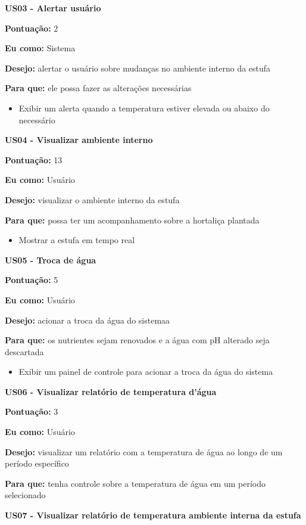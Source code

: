 \textbf{US03 - Alertar usuário}

\textbf{Pontuação:} 2

\textbf{Eu como:} Sistema

\textbf{Desejo:} alertar o usuário sobre mudanças no ambiente interno da estufa

\textbf{Para que:} ele possa fazer as alterações necessárias

\begin{itemize}
	\item Exibir um alerta quando a temperatura estiver elevada ou abaixo do necessário
\end{itemize}

\textbf{US04 - Visualizar ambiente interno}

\textbf{Pontuação:} 13

\textbf{Eu como:} Usuário

\textbf{Desejo:} visualizar o ambiente interno da estufa

\textbf{Para que:} possa ter um acompanhamento sobre a hortaliça plantada

\begin{itemize}
	\item Mostrar a estufa em tempo real
\end{itemize}

\textbf{US05 - Troca de água}

\textbf{Pontuação:} 5

\textbf{Eu como:} Usuário

\textbf{Desejo:} acionar a troca da água do sistemaa

\textbf{Para que:} os nutrientes sejam renovados e a água com pH alterado seja descartada

\begin{itemize}
	\item Exibir um painel de controle para acionar a troca da água do sistema

\end{itemize}

\textbf{US06 - Visualizar relatório de temperatura d’água}

\textbf{Pontuação:} 3

\textbf{Eu como:} Usuário

\textbf{Desejo:} visualizar um relatório com a temperatura de água ao longo de um período específico

\textbf{Para que:} tenha controle sobre a temperatura de água em um período selecionado


\textbf{US07 - Visualizar relatório de temperatura ambiente interna da estufa}

